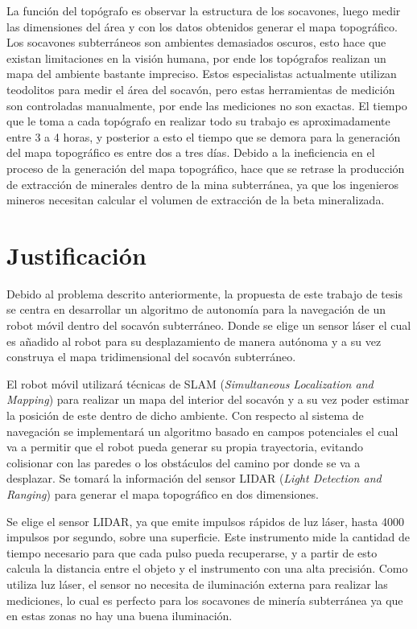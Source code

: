 La función del topógrafo es observar la estructura de los socavones, luego medir 
las dimensiones del área y con los datos obtenidos generar el mapa topográfico. Los 
socavones subterráneos son ambientes demasiados oscuros, esto hace que existan 
limitaciones en la visión humana, por ende los topógrafos realizan un mapa del 
ambiente bastante impreciso. Estos especialistas actualmente utilizan teodolitos 
para medir el área del socavón, pero estas herramientas de medición son 
controladas manualmente, por ende las mediciones no son exactas. El tiempo 
que le toma a cada topógrafo en realizar todo su trabajo es aproximadamente entre 
3 a 4 horas, y posterior a esto el tiempo que se demora para la generación del mapa 
topográfico es entre dos a tres días. Debido a la ineficiencia en el proceso de la 
generación del mapa topográfico, hace que se retrase la producción de extracción 
de minerales dentro de la mina subterránea, ya que los ingenieros mineros 
necesitan calcular el volumen de extracción de la beta mineralizada.



\section{Justificación}

Debido al problema descrito anteriormente, la propuesta de este trabajo de tesis 
se centra en desarrollar un algoritmo de autonomía para la navegaci\'on de un robot 
m\'ovil dentro del socav\'on subterr\'aneo. Donde se elige un sensor l\'aser el 
cual es añadido al robot para su desplazamiento de manera aut\'onoma y a su vez 
construya el mapa tridimensional del socavón subterr\'aneo.

El robot m\'ovil utilizar\'a t\'ecnicas de SLAM (\textit{Simultaneous Localization 
and Mapping}) para realizar un mapa del interior del socav\'on y a su vez poder 
estimar la posici\'on de este dentro de dicho ambiente. Con respecto al sistema 
de navegaci\'on se implementar\'a un algoritmo basado en campos potenciales el 
cual va a permitir que el robot pueda generar su propia trayectoria, evitando 
colisionar con las paredes o los obst\'aculos del camino por donde se va a 
desplazar. Se tomar\'a la informaci\'on del sensor LIDAR (\textit{Light 
Detection and Ranging}) para generar el mapa topogr\'afico en dos dimensiones.

Se elige el sensor LIDAR, ya que emite impulsos r\'apidos de luz l\'aser, hasta 
4000 impulsos por segundo, sobre una superficie. Este instrumento mide la 
cantidad de tiempo necesario para que cada pulso pueda recuperarse, y a partir 
de esto calcula la distancia entre el objeto y el instrumento con una alta 
precisi\'on. Como utiliza luz l\'aser, el sensor no necesita de iluminaci\'on 
externa para realizar las mediciones, lo cual es perfecto para los socavones 
de miner\'ia subterránea ya que en estas zonas no hay una buena iluminaci\'on. 

